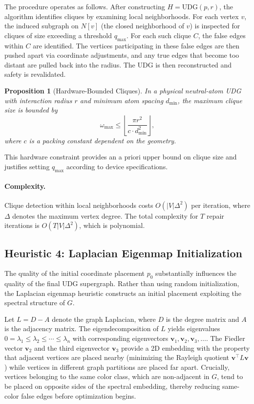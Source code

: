 \documentclass[11pt]{article}
\newtheorem{proposition}{Proposition}
\newcommand{\UDG}{\mathrm{UDG}}
\begin{document}
The procedure operates as follows. After constructing $H=\UDG(p,r)$, the algorithm identifies cliques by examining local neighborhoods. For each vertex $v$, the induced subgraph on $N[v]$ (the closed neighborhood of $v$) is inspected for cliques of size exceeding a threshold $q_{\max}$. For each such clique $C$, the false edges within $C$ are identified. The vertices participating in these false edges are then pushed apart via coordinate adjustments, and any true edges that become too distant are pulled back into the radius. The UDG is then reconstructed and safety is revalidated.

\begin{proposition}[Hardware-Bounded Cliques]
In a physical neutral-atom UDG with interaction radius $r$ and minimum atom spacing $d_{\min}$, the maximum clique size is bounded by
\[
\omega_{\max} \leq \left\lfloor \frac{\pi r^2}{c \cdot d_{\min}^2} \right\rfloor,
\]
where $c$ is a packing constant dependent on the geometry.
\end{proposition}

This hardware constraint provides an a priori upper bound on clique size and justifies setting $q_{\max}$ according to device specifications.

\paragraph{Complexity.}
Clique detection within local neighborhoods costs $O(|V|\Delta^2)$ per iteration, where $\Delta$ denotes the maximum vertex degree. The total complexity for $T$ repair iterations is $O(T|V|\Delta^2)$, which is polynomial.

\newpage

\subsection{Heuristic 4: Laplacian Eigenmap Initialization}

The quality of the initial coordinate placement $p_0$ substantially influences the quality of the final UDG supergraph. Rather than using random initialization, the Laplacian eigenmap heuristic constructs an initial placement exploiting the spectral structure of $G$.

Let $L = D - A$ denote the graph Laplacian, where $D$ is the degree matrix and $A$ is the adjacency matrix. The eigendecomposition of $L$ yields eigenvalues $0 = \lambda_1 \le \lambda_2 \le \cdots \le \lambda_n$ with corresponding eigenvectors $\mathbf{v}_1, \mathbf{v}_2, \mathbf{v}_3, \ldots$. The Fiedler vector $\mathbf{v}_2$ and the third eigenvector $\mathbf{v}_3$ provide a 2D embedding with the property that adjacent vertices are placed nearby (minimizing the Rayleigh quotient $\mathbf{v}^\top L \mathbf{v}$) while vertices in different graph partitions are placed far apart. Crucially, vertices belonging to the same color class, which are non-adjacent in $G$, tend to be placed on opposite sides of the spectral embedding, thereby reducing same-color false edges before optimization begins.
\end{document}
